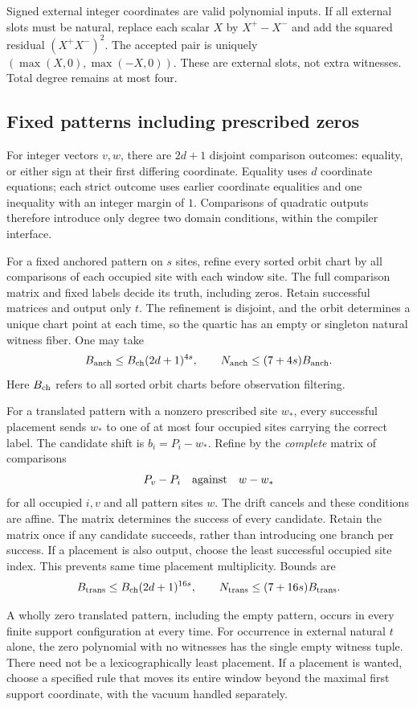 \documentclass[11pt,letterpaper]{article}
\numberwithin{equation}{section}
\theoremstyle{definition}
\theoremstyle{remark}
\begin{document}
Signed external integer coordinates are valid polynomial inputs. If all external slots must be natural, replace each scalar $X$ by $X^+-X^-$ and add the squared residual $(X^+X^-)^2$. The accepted pair is uniquely $(\max(X,0),\max(-X,0))$. These are external slots, not extra witnesses. Total degree remains at most four.

\subsection{Fixed patterns including prescribed zeros}
For integer vectors $v,w$, there are $2d+1$ disjoint comparison outcomes: equality, or either sign at their first differing coordinate. Equality uses $d$ coordinate equations; each strict outcome uses earlier coordinate equalities and one inequality with an integer margin of $1$. Comparisons of quadratic outputs therefore introduce only degree two domain conditions, within the compiler interface.

For a fixed anchored pattern on $s$ sites, refine every sorted orbit chart by all comparisons of each occupied site with each window site. The full comparison matrix and fixed labels decide its truth, including zeros. Retain successful matrices and output only $t$. The refinement is disjoint, and the orbit determines a unique chart point at each time, so the quartic has an empty or singleton natural witness fiber. One may take
\[
 B_{\rm anch}\le B_{\rm ch}(2d+1)^{4s},\qquad
 N_{\rm anch}\le(7+4s)B_{\rm anch}.
\]
Here $B_{\rm ch}$ refers to all sorted orbit charts before observation filtering.

For a translated pattern with a nonzero prescribed site $w_*$, every successful placement sends $w_*$ to one of at most four occupied sites carrying the correct label. The candidate shift is $b_i=P_i-w_*$. Refine by the \emph{complete} matrix of comparisons
\[
 P_v-P_i\quad\hbox{against}\quad w-w_*
\]
for all occupied $i,v$ and all pattern sites $w$. The drift cancels and these conditions are affine. The matrix determines the success of every candidate. Retain the matrix once if any candidate succeeds, rather than introducing one branch per success. If a placement is also output, choose the least successful occupied site index. This prevents same time placement multiplicity. Bounds are
\[
 B_{\rm trans}\le B_{\rm ch}(2d+1)^{16s},\qquad
 N_{\rm trans}\le(7+16s)B_{\rm trans}.
\]

A wholly zero translated pattern, including the empty pattern, occurs in every finite support configuration at every time. For occurrence in external natural $t$ alone, the zero polynomial with no witnesses has the single empty witness tuple. There need not be a lexicographically least placement. If a placement is wanted, choose a specified rule that moves its entire window beyond the maximal first support coordinate, with the vacuum handled separately.
\end{document}
